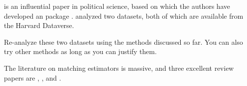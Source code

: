 \begin{HomeworkProblem}\label{exr:15-6}

\citet{ho2007matching} is an influential paper in political science, based on which the authors have developed an  package  \citep{ho2011matchit}. \citet{ho2007matching} analyzed two datasets, both of which are available from the Harvard Dataverse.

Re-analyze these two datasets using the methods discussed so far. You can also try other methods as long as you can justify them.


\end{HomeworkProblem}

\begin{HomeworkProblem}\label{exr:15-7}

The literature on matching estimators is massive, and three excellent review papers are \citet{sekhon2009opiates}, \citet{stuart2010matching}, and \citet{imbens2015matching}.






\end{HomeworkProblem}

